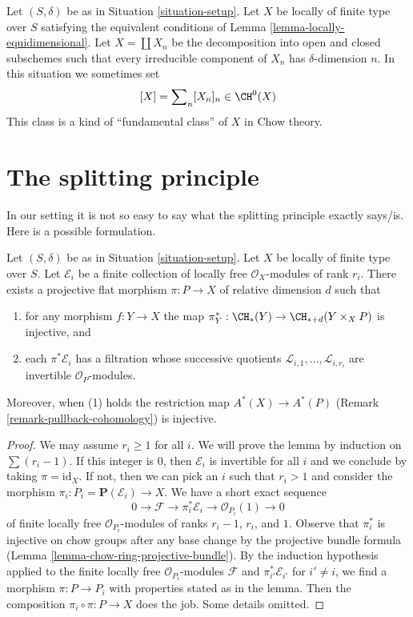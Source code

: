 \begin{remark}
\label{remark-fundamental-class}
Let $(S, \delta)$ be as in Situation \ref{situation-setup}.
Let $X$ be locally of finite type over $S$ satisfying the
equivalent conditions of Lemma \ref{lemma-locally-equidimensional}.
Let $X = \coprod X_n$ be the decomposition into open and closed
subschemes such that every irreducible component of $X_n$ has
$\delta$-dimension $n$. In this situation we sometimes set
$$
[X] = \sum\nolimits_n [X_n]_n \in \CH^0(X)
$$
This class is a kind of ``fundamental class'' of $X$ in Chow theory.
\end{remark}




\section{The splitting principle}
\label{section-splitting-principle}

\noindent
In our setting it is not so easy to say what the splitting principle
exactly says/is. Here is a possible formulation.

\begin{lemma}
\label{lemma-splitting-principle}
Let $(S, \delta)$ be as in Situation \ref{situation-setup}. Let $X$ be locally
of finite type over $S$. Let $\mathcal{E}_i$ be a finite collection of
locally free $\mathcal{O}_X$-modules of rank $r_i$. There exists a projective
flat morphism $\pi : P \to X$ of relative dimension $d$ such that
\begin{enumerate}
\item for any morphism $f : Y \to X$ the map
$\pi_Y^* : \CH_*(Y) \to \CH_{* + d}(Y \times_X P)$ is injective, and
\item each $\pi^*\mathcal{E}_i$ has a filtration
whose successive quotients $\mathcal{L}_{i, 1}, \ldots, \mathcal{L}_{i, r_i}$
are invertible ${\mathcal O}_P$-modules.
\end{enumerate}
Moreover, when (1) holds the restriction map $A^*(X) \to A^*(P)$
(Remark \ref{remark-pullback-cohomology}) is injective.
\end{lemma}

\begin{proof}
We may assume $r_i \geq 1$ for all $i$. We will prove the lemma by induction
on $\sum (r_i - 1)$. If this integer is $0$, then $\mathcal{E}_i$
is invertible for all $i$ and we conclude by taking $\pi = \text{id}_X$.
If not, then we can pick an $i$ such that $r_i > 1$ and consider the
morphism $\pi_i : P_i = \mathbf{P}(\mathcal{E}_i) \to X$.
We have a short exact sequence
$$
0 \to \mathcal{F} \to \pi_i^*\mathcal{E}_i \to \mathcal{O}_{P_i}(1) \to 0
$$
of finite locally free $\mathcal{O}_{P_i}$-modules of ranks $r_i - 1$,
$r_i$, and $1$. Observe that $\pi_i^*$ is injective on chow groups
after any base change by the projective bundle formula
(Lemma \ref{lemma-chow-ring-projective-bundle}).
By the induction hypothesis applied to the finite locally free
$\mathcal{O}_{P_i}$-modules $\mathcal{F}$ and $\pi_{i'}^*\mathcal{E}_{i'}$
for $i' \not = i$, we find a morphism $\pi : P \to P_i$ with
properties stated as in the lemma. Then the composition
$\pi_i \circ \pi : P \to X$ does the job. Some details omitted.
\end{proof}


